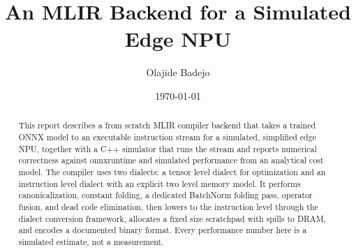 \documentclass[11pt]{article}
\title{An MLIR Backend for a Simulated Edge NPU}
\author{Olajide Badejo}
\date{\today}
\begin{document}
\maketitle

\begin{abstract}
This report describes a from scratch MLIR compiler backend that takes a trained
ONNX model to an executable instruction stream for a simulated, simplified edge
NPU, together with a C++ simulator that runs the stream and reports numerical
correctness against onnxruntime and simulated performance from an analytical cost
model. The compiler uses two dialects: a tensor level dialect for optimization and
an instruction level dialect with an explicit two level memory model. It performs
canonicalization, constant folding, a dedicated BatchNorm folding pass, operator
fusion, and dead code elimination, then lowers to the instruction level through
the dialect conversion framework, allocates a fixed size scratchpad with spills to
DRAM, and encodes a documented binary format. Every performance number here is a
simulated estimate, not a measurement.
\end{abstract}













\end{document}
